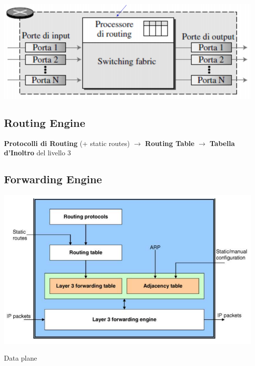 \documentclass[10pt]{article}
\begin{document}
\begin{center}
\includegraphics[scale=0.7]{routercomponenti.png}
\end{center}
\pagebreak
\subsection{Routing Engine}
\textbf{Protocolli di Routing} (+ static routes) $\longrightarrow$ \textbf{Routing Table} $\longrightarrow$ \textbf{Tabella d'Inoltro} del livello 3
\subsection{Forwarding Engine}
\begin{center}
\includegraphics[scale=0.7]{forwardingengine.png}
\end{center}
Data plane
\end{document}
